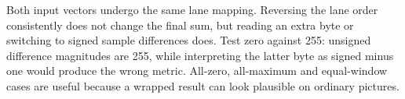 Both input vectors undergo the same lane mapping. Reversing the lane order
consistently does not change the final sum, but reading an extra byte or switching
to signed sample differences does. Test zero against 255: unsigned difference
magnitudes are 255, while interpreting the latter byte as signed minus one would
produce the wrong metric. All-zero, all-maximum and equal-window cases are useful
because a wrapped result can look plausible on ordinary pictures.
